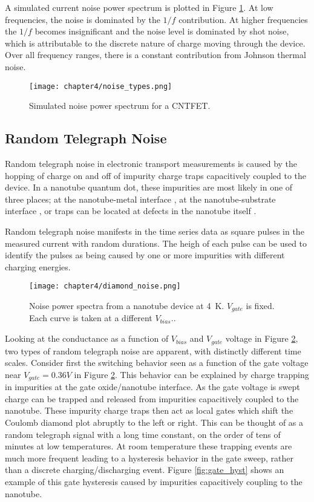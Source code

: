 A simulated current noise power spectrum is plotted in Figure \ref{fig:simulated_noise}. At low frequencies, the noise is dominated by the $1/f$ contribution. At higher frequencies the $1/f$ becomes insignificant and the noise level is dominated by shot noise, which is attributable to the discrete nature of charge moving through the device. Over all frequency ranges, there is a constant contribution from Johnson thermal noise.

\begin{figure}
    \centering
    \texttt{[image: chapter4/noise\_types.png]}
    \caption{Simulated noise power spectrum for a CNTFET.}
    \label{fig:simulated_noise}
\end{figure}

\subsection{Random Telegraph Noise}
\label{sec:RTN}

Random telegraph noise in electronic transport measurements is caused by the hopping of charge on and off of impurity charge traps capacitively coupled to the device. In a nanotube quantum dot, these impurities are most likely in one of three places; at the nanotube-metal interface \cite{Liu 2006}, at the nanotube-substrate interface \cite{Liu2006, Sydoruk2014}, or traps can be located at defects in the nanotube itself \cite{Stokes2010}.

Random telegraph noise manifests in the time series data as square pulses in the measured current with random durations. The heigh of each pulse can be used to identify the pulses as being caused by one or more impurities with different charging energies.

\begin{figure}
    \centering
    \texttt{[image: chapter4/diamond\_noise.png]}
    \caption{Noise power spectra from a nanotube device at \SI{4}{\kelvin}. $V_{gate}$ is fixed. Each curve is taken at a different $V_{bias}.$.}
    \label{fig:diamond_noise}
\end{figure}

Looking at the conductance as a function of $V_{bias}$ and $V_{gate}$ voltage in Figure \ref{fig:diamond_noise}, two types of random telegraph noise are apparent, with distinctly different time scales. Consider first the switching behavior seen as a function of the gate voltage near $V_{gate} = 0.36V$ in Figure \ref{fig:diamond_noise}. This behavior can be explained by charge trapping in impurities at the gate oxide/nanotube interface. As the gate voltage is swept charge can be trapped and released from impurities capacitively coupled to the nanotube. These impurity charge traps then act as local gates which shift the Coulomb diamond plot abruptly to the left or right. This can be thought of as a random telegraph signal with a long time constant, on the order of tens of minutes at low temperatures. At room temperature these trapping events are much more frequent leading to a hysteresis behavior in the gate sweep, rather than a discrete charging/discharging event. Figure \ref{fig:gate_hyst} shows an example of this gate hysteresis caused by impurities capacitively coupling to the nanotube.

